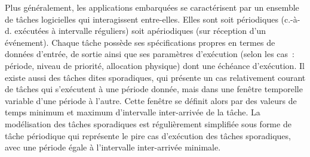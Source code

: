 \documentclass[french, a4paper, 11pt, twoside, pdftex]{StyleThese}
\begin{document}
		Plus généralement, les applications embarquées se caractérisent par un ensemble de tâches logicielles qui interagissent entre-elles. Elles sont soit périodiques (c.-à-d. exécutées à intervalle réguliers) soit apériodiques (sur réception d'un événement). Chaque tâche possède ses spécifications propres en termes de données d'entrée, de sortie ainsi que ses paramètres d'exécution (selon les cas : période, niveau de priorité, allocation physique) dont une échéance d'exécution. Il existe aussi des tâches dites sporadiques, qui présente un cas relativement courant de tâches qui s'exécutent à une période donnée, mais dans une fenêtre temporelle variable d'une période à l'autre. Cette fenêtre se définit alors par des valeurs de temps minimum et maximum d'intervalle inter-arrivée de la tâche. La modélisation des tâches sporadiques est régulièrement simplifiée sous forme de tâche périodique qui représente le pire cas d'exécution des tâches sporadiques, avec une période égale à l'intervalle inter-arrivée minimale.
		
\end{document}
